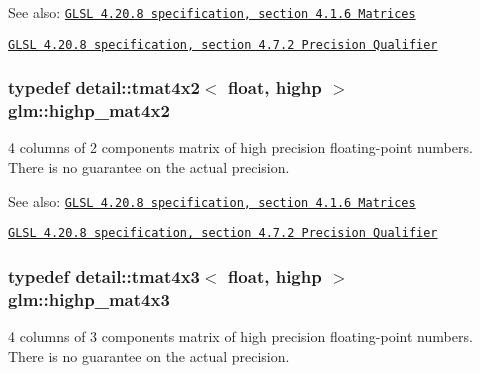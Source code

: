 \begin{Desc}
\item[See also:]\href{http://www.opengl.org/registry/doc/GLSLangSpec.4.20.8.pdf}{\tt GLSL 4.20.8 specification, section 4.1.6 Matrices} 

\href{http://www.opengl.org/registry/doc/GLSLangSpec.4.20.8.pdf}{\tt GLSL 4.20.8 specification, section 4.7.2 Precision Qualifier} \end{Desc}
\hypertarget{group__core__precision_gdf9c4a7947c2b0a79f52cc86a860f270}{
\subsubsection[highp\_\-mat4x2]{\setlength{\rightskip}{0pt plus 5cm}typedef detail::tmat4x2$<$ float, highp $>$ {\bf glm::highp\_\-mat4x2}}}
\label{group__core__precision_gdf9c4a7947c2b0a79f52cc86a860f270}


4 columns of 2 components matrix of high precision floating-point numbers. There is no guarantee on the actual precision.

\begin{Desc}
\item[See also:]\href{http://www.opengl.org/registry/doc/GLSLangSpec.4.20.8.pdf}{\tt GLSL 4.20.8 specification, section 4.1.6 Matrices} 

\href{http://www.opengl.org/registry/doc/GLSLangSpec.4.20.8.pdf}{\tt GLSL 4.20.8 specification, section 4.7.2 Precision Qualifier} \end{Desc}
\hypertarget{group__core__precision_gb8dfe989c5100c35ab5dec0e94f59d2a}{
\subsubsection[highp\_\-mat4x3]{\setlength{\rightskip}{0pt plus 5cm}typedef detail::tmat4x3$<$ float, highp $>$ {\bf glm::highp\_\-mat4x3}}}
\label{group__core__precision_gb8dfe989c5100c35ab5dec0e94f59d2a}


4 columns of 3 components matrix of high precision floating-point numbers. There is no guarantee on the actual precision.

